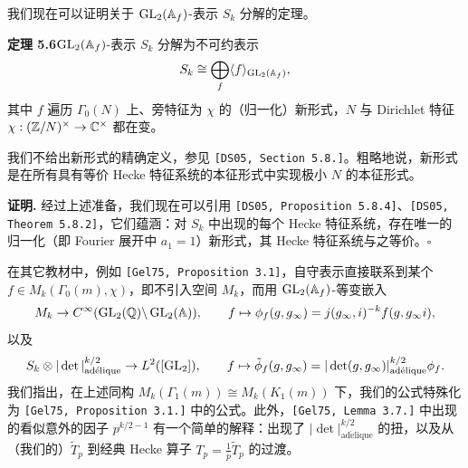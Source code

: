 我们现在可以证明关于 $\operatorname{GL}_2(\mathbb{A}_f)$-表示 $S_k$ 分解的定理。

\noindent\textbf{定理 5.6}\label{thm:5.6}\quad $\operatorname{GL}_2(\mathbb{A}_f)$-表示 $S_k$ 分解为不可约表示
\[
S_k\cong\bigoplus_f\langle f\rangle_{\operatorname{GL}_2(\mathbb{A}_f)},
\]
其中 $f$ 遍历 $\Gamma_0(N)$ 上、旁特征为 $\chi$ 的（归一化）新形式，$N$ 与 Dirichlet 特征 $\chi:(\mathbb{Z}/N)^\times\to\mathbb{C}^\times$ 都在变。

我们不给出新形式的精确定义，参见 \texttt{[DS05, Section 5.8.]}。粗略地说，新形式是在所有具有等价 Hecke 特征系统的本征形式中实现极小 $N$ 的本征形式。

\textbf{证明.} 经过上述准备，我们现在可以引用 \texttt{[DS05, Proposition 5.8.4]}、\texttt{[DS05, Theorem 5.8.2]}，它们蕴涵：对 $S_k$ 中出现的每个 Hecke 特征系统，存在唯一的归一化（即 Fourier 展开中 $a_1=1$）新形式，其 Hecke 特征系统与之等价。\hfill$\square$

在其它教材中，例如 \texttt{[Gel75, Proposition 3.1]}，自守表示直接联系到某个 $f\in M_k(\Gamma_0(m),\chi)$，即不引入空间 $M_k$，而用 $\operatorname{GL}_2(\mathbb{A}_f)$-等变嵌入
\[
M_k\to C^\infty(\operatorname{GL}_2(\mathbb{Q})\backslash\operatorname{GL}_2(\mathbb{A})),\qquad
f\mapsto\phi_f(g,g_\infty)=j(g_\infty,i)^{-k}f(g,g_\infty i),
\]
以及
\[
S_k\otimes|\det|_{\mathrm{ad\acute elique}}^{k/2}\to L^2([\operatorname{GL}_2]),\qquad
f\mapsto\tilde\phi_f(g,g_\infty)=|\det(g,g_\infty)|_{\mathrm{ad\acute elique}}^{k/2}\phi_f.
\]
我们指出，在上述同构 $M_k(\Gamma_1(m))\cong M_k(K_1(m))$ 下，我们的公式特殊化为 \texttt{[Gel75, Proposition 3.1.]} 中的公式。此外，\texttt{[Gel75, Lemma 3.7.]} 中出现的看似意外的因子 $p^{k/2-1}$ 有一个简单的解释：出现了 $|\det|_{\mathrm{ad\acute elique}}^{k/2}$ 的扭，以及从（我们的）$\tilde T_p$ 到经典 Hecke 算子 $T_p=\frac1p\tilde T_p$ 的过渡。
